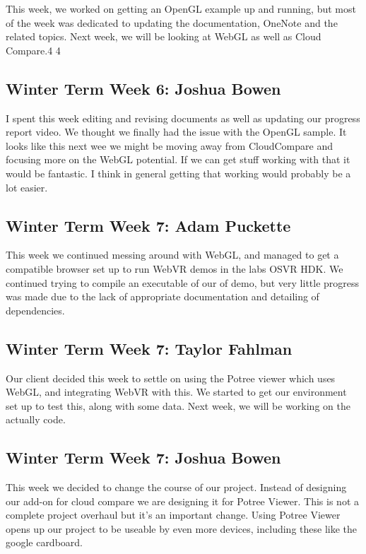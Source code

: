 \documentclass[draftclsnofoot,onecolumn]{IEEEtran}
\begin{document}
This week, we worked on getting an OpenGL example up and running, but most of the week was dedicated to updating the documentation, OneNote and the related topics. Next week, we will be looking at WebGL as well as Cloud Compare.4 4

\subsection{Winter Term Week 6: Joshua Bowen}

I spent this week editing and revising documents as well as updating our progress report video. We thought we finally had the issue with the OpenGL sample. It looks like this next wee we might be moving away from CloudCompare and focusing more on the WebGL potential. If we can get stuff working with that it would be fantastic. I think in general getting that working would probably be a lot easier.

\subsection{Winter Term Week 7: Adam Puckette}

This week we continued messing around with WebGL, and managed to get a compatible browser set up to run WebVR demos in the labs OSVR HDK. We continued trying to compile an executable of our of demo, but very little progress was made due to the lack of appropriate documentation and detailing of dependencies.

\subsection{Winter Term Week 7: Taylor Fahlman}

Our client decided this week to settle on using the Potree viewer which uses WebGL, and integrating WebVR with this. We started to get our environment set up to test this, along with some data. Next week, we will be working on the actually code.

\subsection{Winter Term Week 7: Joshua Bowen}

This week we decided to change the course of our project. Instead of designing our add-on for cloud compare we are designing it for Potree Viewer. This is not a complete project overhaul but it's an important change. Using Potree Viewer opens up our project to be useable by even more devices, including these like the google cardboard.
\end{document}
